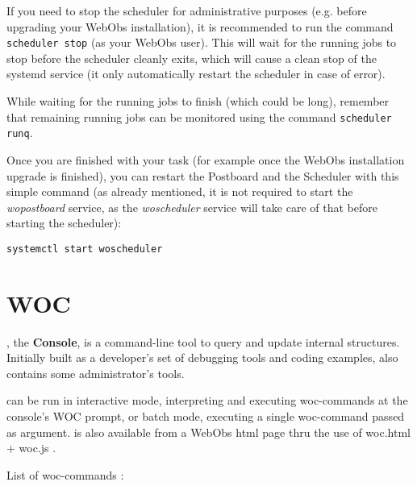 If you need to stop the scheduler for administrative purposes (e.g. before
upgrading your WebObs installation), it is recommended to run the command
\texttt{scheduler stop} (as your WebObs user). This will wait for the running
jobs to stop before the scheduler cleanly exits, which will cause a clean stop
of the systemd service (it only automatically restart the scheduler in case of
error).

While waiting for the running jobs to finish (which could be long), remember
that remaining running jobs can be monitored using the command
\texttt{scheduler runq}.

Once you are finished with your task (for example once the WebObs installation
upgrade is finished), you can restart the Postboard and the Scheduler with this
simple command (as already mentioned, it is not required to start the
\textit{wopostboard} service, as the \textit{woscheduler} service will take
care of that before starting the scheduler):
\begin{lstlisting}[style=console]
systemctl start woscheduler
\end{lstlisting}


\section{WOC}

, the \webobs \textbf{Console}, is a command-line tool to query and update internal \webobs structures.
Initially built as a developer's set of debugging tools and coding examples,  also contains some \webobs administrator's tools. 

 can be run in interactive mode, interpreting and executing woc-commands at the console's WOC prompt, or 
batch mode, executing a single woc-command passed as argument.  is also available from a WebObs html page 
thru the use of woc.html + woc.js .

List of woc-commands :


